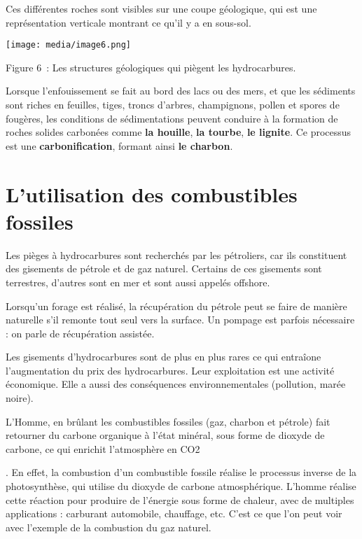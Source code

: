 \begin{itemize}
Ces différentes roches sont visibles sur une coupe géologique, qui est
une représentation verticale montrant ce qu'il y a en sous-sol.

\texttt{[image: media/image6.png]}

\protect\hypertarget{les-structures-guxe9ologiques-qui-piuxe8gent-l}{}{}Figure
6~: Les structures géologiques qui piègent les hydrocarbures.

Lorsque l'enfouissement se fait au bord des lacs ou des mers, et que les
sédiments sont riches en feuilles, tiges, troncs d'arbres, champignons,
pollen et spores de fougères, les conditions de sédimentations peuvent
conduire à la formation de roches solides carbonées comme \textbf{la
houille}, \textbf{la tourbe}, \textbf{le lignite}. Ce processus est une
\textbf{carbonification}, formant ainsi \textbf{le charbon}.

\section{L'utilisation des combustibles
fossiles}\label{lutilisation-des-combustibles-fossiles}

Les pièges à hydrocarbures sont recherchés par les pétroliers, car ils
constituent des gisements de pétrole et de gaz naturel. Certains de ces
gisements sont terrestres, d'autres sont en mer et sont aussi appelés
offshore.

Lorsqu'un forage est réalisé, la récupération du pétrole peut se faire
de manière naturelle s'il remonte tout seul vers la surface. Un pompage
est parfois nécessaire : on parle de récupération assistée.

Les gisements d'hydrocarbures sont de plus en plus rares ce qui
entraîone l'augmentation du prix des hydrocarbures. Leur exploitation
est une activité économique. Elle a aussi des conséquences
environnementales (pollution, marée noire).

L'Homme, en brûlant les combustibles fossiles (gaz, charbon et pétrole)
fait retourner du carbone organique à l'état minéral, sous forme de
dioxyde de carbone, ce qui enrichit l'atmosphère en CO2

. En effet, la combustion d'un combustible fossile réalise le processus
inverse de la photosynthèse, qui utilise du dioxyde de carbone
atmosphérique. L'homme réalise cette réaction pour produire de l'énergie
sous forme de chaleur, avec de multiples applications : carburant
automobile, chauffage, etc. C'est ce que l'on peut voir avec l'exemple
de la combustion du gaz naturel.


\end{itemize}
